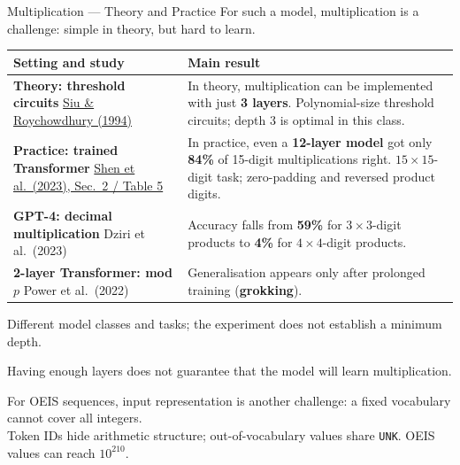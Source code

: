 \documentclass[aspectratio=169,10pt]{beamer}
\newcommand{\readout}[1]{\textcolor{readoutblue}{{\mdseries #1}}}
\begin{document}
\begin{frame}{Multiplication --- Theory and Practice}
\footnotesize
  \setlength{\parskip}{0pt}
  \readout{For such a model, multiplication is a challenge: simple in theory, but hard to learn.}
  \par\smallskip
  {\setlength{\tabcolsep}{4pt}\renewcommand{\arraystretch}{1.1}
  \begin{tabular}{@{}>{\raggedright\arraybackslash}p{}>{\raggedright\arraybackslash}p{}@{}}
    \toprule
    \textbf{Setting and study} & \textbf{Main result} \\
    \midrule
    \textbf{Theory: threshold circuits}\newline
    \href{https://doi.org/10.1137/S0895480192228619}{Siu \& Roychowdhury (1994)}
      & \readout{In theory, multiplication can be implemented with just \textbf{3 layers}.}\newline
        Polynomial-size threshold circuits; depth 3 is optimal in this class. \\
    \addlinespace[0.3em]
    \textbf{Practice: trained Transformer}\newline
    \href{https://arxiv.org/abs/2311.14737}{Shen et al.\ (2023), Sec.\ 2 / Table 5}
      & \readout{In practice, even a \textbf{12-layer model} got only \textbf{84\%} of 15-digit multiplications right.}\newline
        $15{\times}15$-digit task; zero-padding and reversed product digits. \\
    \addlinespace[0.3em]
    \textbf{GPT-4: decimal multiplication}\newline
    Dziri et al.\ (2023)
      & Accuracy falls from \textbf{59\%} for $3{\times}3$-digit products
        to \textbf{4\%} for $4{\times}4$-digit products. \\
    \addlinespace[0.3em]
    \textbf{2-layer Transformer: mod $p$}\newline
    Power et al.\ (2022)
      & Generalisation appears only after prolonged training (\textbf{grokking}). \\
    \bottomrule
  \end{tabular}}
  \par\smallskip
  {\scriptsize Different model classes and tasks; the experiment does not establish a minimum depth.}\par\smallskip
  \readout{Having enough layers does not guarantee that the model will learn multiplication.}
  \par\smallskip
  \readout{For OEIS sequences, input representation is another challenge: a fixed vocabulary cannot cover all integers.}\\
  Token IDs hide arithmetic structure; out-of-vocabulary values share \texttt{UNK}.
  OEIS values can reach $10^{210}$.
\end{frame}
\end{document}
